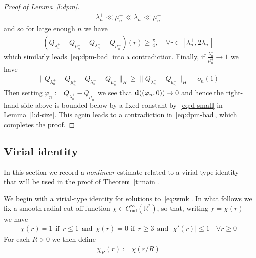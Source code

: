 \documentclass[10pt,reqno]{amsart}
\newcommand{\Red}[1]{{\color{red} #1}}
\newcommand{\R}{\mathbb{R}}
\newcommand{\Sp}{\mathbb{S}}
\newcommand{\fy}{\varphi}
\newcommand{\la}{\lambda}
\newcommand{\ba}{\overline}
\newcommand{\ang}[1]{\left\langle{#1}\right\rangle}
\newcommand{\abs}[1]{\left\lvert{#1}\right\rvert}
\newcommand{\EQ}[1]{\begin{equation}\begin{split} #1 \end{split}\end{equation}}
\numberwithin{equation}{section}
\theoremstyle{remark}
\newcommand{\mand}{{\ \ \text{and} \ \  }}
\newcommand{\mif}{{\ \ \text{if} \ \ }}
\newcommand{\rdr}{ \, r \, \mathrm{d}r}
\newcommand{\0}{\emptyset}
\newcommand{\bfd}{{\bf d}}
\begin{document}
\begin{proof}[Proof of Lemma~\ref{l:dpm}]
\EQ{
\la_n^+ \ll \mu_{n}^+ \ll \la_{n}^- \ll \mu_n^-
}
and so for large enough $n$ we have 
\EQ{
(Q_{\la_n^+} - Q_{\mu_{n}^+} + Q_{\la_n^-} - Q_{\mu_{n}^-})(r) \ge \frac{\pi}{4}, \quad \forall r \in  [\la_{n}^+,  2 \la_{n}^+]
}
which similarly leads~\eqref{eq:dpm-bad} into a contradiction. Finally, if $ \frac{\la_{n}^{-}}{\mu_{n}^+} \to 1$ we have 
\EQ{
\| Q_{\la_n^+} - Q_{\mu_{n}^+} + Q_{\la_n^-} - Q_{\mu_{n}^-} \|_H  \ge \| Q_{\la_n^+} - Q_{\mu_{n}^-} \|_H - o_n(1)
}
Then setting $\fy_n:=Q_{\la_n^+} - Q_{\mu_{n}^-}$ we see that $\bfd((\fy_n, 0)) \to 0$ and hence the right-hand-side above is bounded below by a fixed constant by~\eqref{eq:d-small} in Lemma~\ref{l:d-size}. This again leads to a contradiction in~\eqref{eq:dpm-bad}, which completes the proof. 
 \end{proof} 
 
 
%
 
 \subsection{Virial identity} 
 
 In this section we record a \emph{nonlinear} estimate related to a virial-type identity that will be used in the proof of Theorem~\ref{t:main}. 
 
 We begin with a virial-type  identity for solutions to~\eqref{eq:wmk}. In what follows we fix a smooth radial cut-off function  $\chi \in C^{\infty}_{\mathrm{rad}}(\R^2)$, so that, writing $\chi = \chi(r)$ we have 
 \EQ{
  \chi(r) = 1 \mif r \le 1 \mand  \chi(r) = 0 \mif r \ge 3 \mand \abs{\chi'(r)} \le 1\quad \forall r \ge 0
 }
 For each $R>0$ we then define 
 \EQ{
 \chi_R(r) := \chi(r/ R)
 }
 
\end{document}
